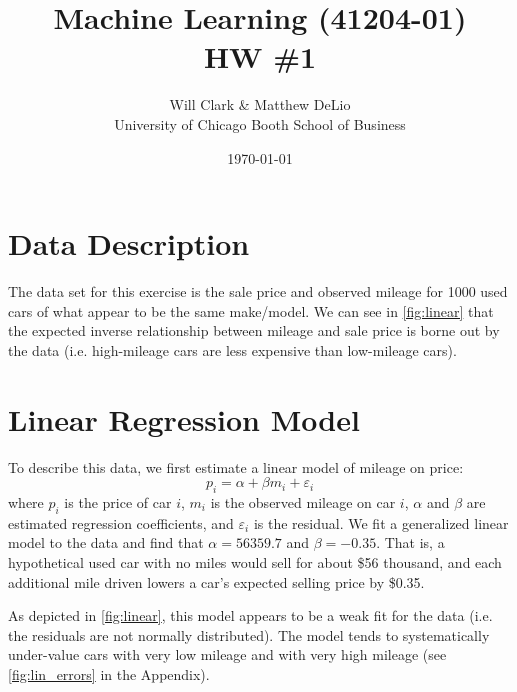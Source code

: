 \documentclass[11pt, fleqn]{article}
\begin{document}
\title{Machine Learning (41204-01)\\HW \#1}
\author{Will Clark \& Matthew DeLio \\
University of Chicago Booth School of Business}
\date{\today}
\maketitle


\section{Data Description}

The data set for this exercise is the sale price and observed mileage for 1000 used cars of what appear to be the same make/model. We can see in \cref{fig:linear} that the expected inverse relationship between mileage and sale price is borne out by the data (i.e. high-mileage cars are less expensive than low-mileage cars).

\section{Linear Regression Model}\label{sec:linear}

To describe this data, we first estimate a linear model of mileage on price:
\[ p_i = \alpha + \beta m_i + \varepsilon_i \]
where \(p_i\) is the price of car \(i\), \(m_i\) is the observed mileage on car \(i\), \(\alpha\) and \(\beta\) are estimated regression coefficients, and \(\varepsilon_i\) is the residual. We fit a generalized linear model to the data and find that \(\alpha=56359.7\) and \(\beta=-0.35\). That is, a hypothetical used car with no miles would sell for about \$56 thousand, and each additional mile driven lowers a car's expected selling price by \$0.35.

As depicted in \cref{fig:linear}, this model appears to be a weak fit for the data (i.e. the residuals are not normally distributed). The model tends to systematically under-value cars with very low mileage and with very high mileage (see \cref{fig:lin_errors} in the Appendix). 
\end{document}
